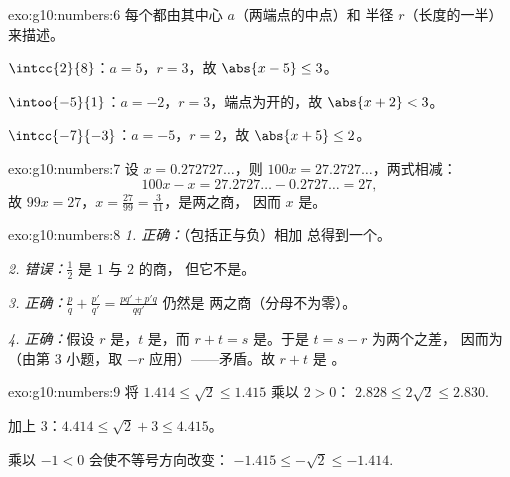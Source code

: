 \begin{solution}{exo:g10:numbers:6}
每个都由其中心 $a$（两端点的中点）和
半径 $r$（长度的一半）来描述。

$\intcc{2}{8}$：$a = 5$，$r = 3$，故 $\abs{x - 5} \leq 3$。

$\intoo{-5}{1}$：$a = -2$，$r = 3$，端点为开的，故 $\abs{x + 2} < 3$。

$\intcc{-7}{-3}$：$a = -5$，$r = 2$，故 $\abs{x + 5} \leq 2$。
\end{solution}

\begin{solution}{exo:g10:numbers:7}
设 $x = 0.272727\dots$，则 $100x = 27.2727\dots$，两式相减：
\[
100x - x = 27.2727\dots - 0.2727\dots = 27,
\]
故 $99x = 27$，$x = \frac{27}{99} = \frac{3}{11}$，是两之商，
因而 $x$ 是。
\end{solution}

\begin{solution}{exo:g10:numbers:8}
\emph{1. 正确：}（包括正与负）相加
总得到一个。

\emph{2. 错误：}$\frac{1}{2}$ 是 $1$ 与 $2$ 的商，
但它不是。

\emph{3. 正确：}$\frac pq + \frac{p'}{q'} = \frac{pq' + p'q}{qq'}$ 仍然是
两之商（分母不为零）。

\emph{4. 正确：}假设 $r$ 是，$t$ 是，而 $r + t = s$
是。于是 $t = s - r$ 为两个之差，
因而为（由第 3 小题，取 $-r$ 应用）——矛盾。故 $r + t$ 是
。
\end{solution}

\begin{solution}{exo:g10:numbers:9}
将 $1.414 \leq \sqrt2 \leq 1.415$ 乘以 $2 > 0$：
$2.828 \leq 2\sqrt2 \leq 2.830$.

加上 $3$：$4.414 \leq \sqrt2 + 3 \leq 4.415$。

乘以 $-1 < 0$ 会使不等号方向改变：
$-1.415 \leq -\sqrt2 \leq -1.414$.
\end{solution}

